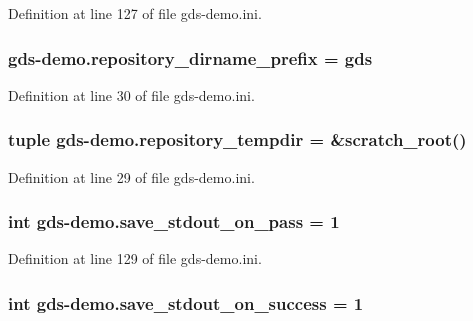 Definition at line 127 of file gds-\/demo.\-ini.

\hypertarget{namespacegds-demo_a2840f90f55bf220489772c7ec78979da}{
\subsubsection[{repository\-\_\-dirname\-\_\-prefix}]{\setlength{\rightskip}{0pt plus 5cm}gds-\/demo.\-repository\-\_\-dirname\-\_\-prefix = gds}}\label{namespacegds-demo_a2840f90f55bf220489772c7ec78979da}


Definition at line 30 of file gds-\/demo.\-ini.

\hypertarget{namespacegds-demo_a963db84d8e885972e94d04061614763f}{
\subsubsection[{repository\-\_\-tempdir}]{\setlength{\rightskip}{0pt plus 5cm}tuple gds-\/demo.\-repository\-\_\-tempdir = \&scratch\-\_\-root()}}\label{namespacegds-demo_a963db84d8e885972e94d04061614763f}


Definition at line 29 of file gds-\/demo.\-ini.

\hypertarget{namespacegds-demo_a1722e1d7e83a472b8e35a9dcf5e25e0b}{
\subsubsection[{save\-\_\-stdout\-\_\-on\-\_\-pass}]{\setlength{\rightskip}{0pt plus 5cm}int gds-\/demo.\-save\-\_\-stdout\-\_\-on\-\_\-pass = 1}}\label{namespacegds-demo_a1722e1d7e83a472b8e35a9dcf5e25e0b}


Definition at line 129 of file gds-\/demo.\-ini.

\hypertarget{namespacegds-demo_a24caa146e72b64ae967de159484d1ab0}{
\subsubsection[{save\-\_\-stdout\-\_\-on\-\_\-success}]{\setlength{\rightskip}{0pt plus 5cm}int gds-\/demo.\-save\-\_\-stdout\-\_\-on\-\_\-success = 1}}\label{namespacegds-demo_a24caa146e72b64ae967de159484d1ab0}


